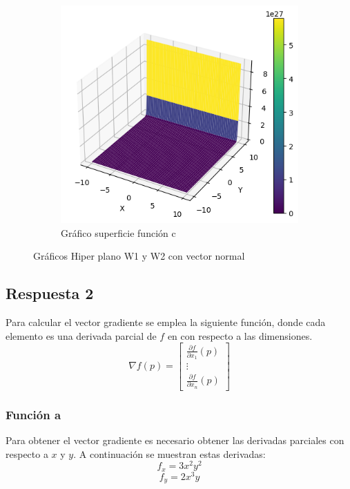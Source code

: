 \documentclass[12 pt]{article}
\begin{document}
\begin{figure}[H]
\begin{subfigure}[b]{0.45\linewidth}
    \end{subfigure}
      \begin{subfigure}[b]{0.45\linewidth}
        \centering
        \includegraphics[width=\linewidth]{img/c.png}
        \caption{Gráfico superficie función c}
        \label{fig:w2}
    \end{subfigure}
    \caption{Gráficos Hiper plano W1 y W2 con vector normal}
    \label{fig:planos}
\end{figure}
\subsection{Respuesta 2}
Para calcular el vector gradiente se emplea la siguiente función, donde cada elemento es una derivada parcial de $f$ en con respecto a las dimensiones.
\[
\nabla f(p) = \begin{bmatrix}
 \frac{\partial f}{\partial x_1}(p) \\
 \vdots \\
 \frac{\partial f}{\partial x_n}(p)
\end{bmatrix}
\]

\subsubsection{Función a}
Para obtener el vector gradiente es necesario obtener las derivadas parciales con respecto a $x$ y $y$. A continuación se muestran estas derivadas:
\[
    f_x = 3x^2y^2
\]
\[
    f_y = 2x^3y
\]
\end{document}
